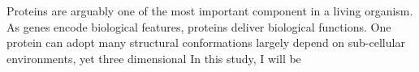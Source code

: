 Proteins are arguably one of the most important component in a living organism. As genes encode biological features, proteins deliver biological functions. One protein can adopt many structural conformations largely depend on sub-cellular environments, yet  three dimensional     In this study, I will be 